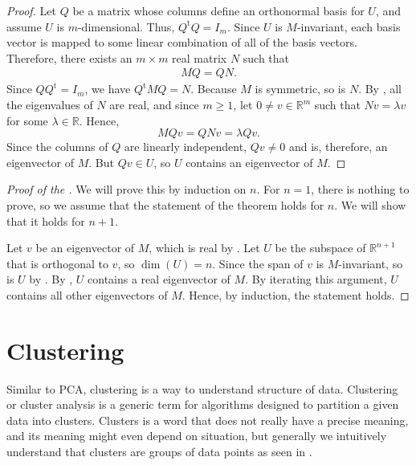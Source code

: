 \documentclass[a4paper, 12pt]{article}
\numberwithin{equation}{section}
\numberwithin{figure}{section}
\theoremstyle{definition}
\renewcommand{\geq}{\geqslant}
\newcommand{\R}{\mathbb{R}}
\newcommand{\tr}{\mathrm{t}}
\begin{document}
\begin{proof}
	Let $Q$ be a matrix whose columns define an orthonormal basis for $U$, and
	assume $U$ is $m$-dimensional. Thus, $Q^{\tr}Q = I_m$. Since $U$ is
	$M$-invariant, each basis vector is mapped to some linear combination of all
	of the basis vectors. Therefore, there exists an $m\times m$ real matrix $N$
	such that 
	\begin{align*}
		MQ = QN. 
	\end{align*}
	Since $QQ^{\tr} = I_m$, we have $Q^{\tr}MQ = N$. Because $M$ is symmetric,
	so is $N$. By , all the eigenvalues of $N$ are real,
	and since $m\geq 1$, let $0\neq v\in\R^m$ such that $Nv=\lambda v$ for some
	$\lambda\in \R$. Hence, 
	\[ 
		MQv = QNv = \lambda Qv.
	\] 
	Since the columns of $Q$ are linearly independent, $Qv\neq 0$ and is,
	therefore, an eigenvector of $M$. But $Qv\in U$, so $U$ contains an
	eigenvector of $M$.
\end{proof}

\begin{proof}[Proof of the ]
	We will prove this by induction on $n$. For $n=1$, there is nothing to
	prove, so we assume that the statement of the theorem holds for $n$. We will
	show that it holds for $n+1$.

	Let $v$ be an eigenvector of $M$, which is real by .
	Let $U$ be the subspace of $\R^{n+1}$ that is orthogonal to $v$, so $\dim(U)
	= n$. Since the span of $v$ is $M$-invariant, so is $U$ by
	. By , $U$ contains a real
	eigenvector of $M$. By iterating this argument, $U$ contains all other
	eigenvectors of $M$. Hence, by induction, the statement holds. 
\end{proof}

\iffalse

\section{Clustering}

Similar to PCA, clustering is a way to understand structure of data. Clustering
or cluster analysis is a generic term for algorithms designed to partition a
given data into clusters. Clusters is a word that does not really have a precise
meaning, and its meaning might even depend on situation, but generally we
intuitively understand that clusters are groups of data points as seen in
.
\end{document}
